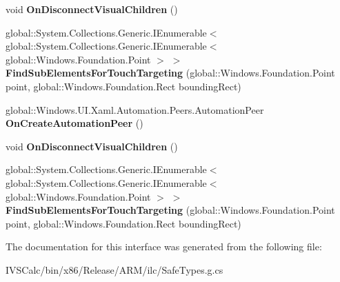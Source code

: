 \begin{DoxyCompactItemize}
void {\bfseries On\+Disconnect\+Visual\+Children} ()
\item 
\mbox{\label{interface_windows_1_1_u_i_1_1_xaml_1_1_i_u_i_element_overrides_a5714beae53dfcb7b4ec4a10f33a9677c}} 
global\+::\+System.\+Collections.\+Generic.\+I\+Enumerable$<$ global\+::\+System.\+Collections.\+Generic.\+I\+Enumerable$<$ global\+::\+Windows.\+Foundation.\+Point $>$ $>$ {\bfseries Find\+Sub\+Elements\+For\+Touch\+Targeting} (global\+::\+Windows.\+Foundation.\+Point point, global\+::\+Windows.\+Foundation.\+Rect bounding\+Rect)
\item 
\mbox{\label{interface_windows_1_1_u_i_1_1_xaml_1_1_i_u_i_element_overrides_ab9b9f7e630841a2f31a5fcc322e5d783}} 
global\+::\+Windows.\+U\+I.\+Xaml.\+Automation.\+Peers.\+Automation\+Peer {\bfseries On\+Create\+Automation\+Peer} ()
\item 
\mbox{\label{interface_windows_1_1_u_i_1_1_xaml_1_1_i_u_i_element_overrides_aa24ecfd911511d1d3d8e9156c62ed212}} 
void {\bfseries On\+Disconnect\+Visual\+Children} ()
\item 
\mbox{\label{interface_windows_1_1_u_i_1_1_xaml_1_1_i_u_i_element_overrides_a5714beae53dfcb7b4ec4a10f33a9677c}} 
global\+::\+System.\+Collections.\+Generic.\+I\+Enumerable$<$ global\+::\+System.\+Collections.\+Generic.\+I\+Enumerable$<$ global\+::\+Windows.\+Foundation.\+Point $>$ $>$ {\bfseries Find\+Sub\+Elements\+For\+Touch\+Targeting} (global\+::\+Windows.\+Foundation.\+Point point, global\+::\+Windows.\+Foundation.\+Rect bounding\+Rect)
\end{DoxyCompactItemize}


The documentation for this interface was generated from the following file\+:\begin{DoxyCompactItemize}
\item 
I\+V\+S\+Calc/bin/x86/\+Release/\+A\+R\+M/ilc/Safe\+Types.\+g.\+cs\end{DoxyCompactItemize}
